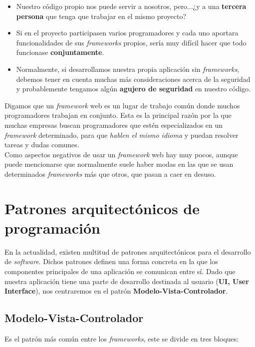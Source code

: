     \begin{itemize}
        \item Nuestro código propio nos puede servir a nosotros, pero...¿y a una
        \textbf{tercera persona} que tenga que trabajar en el mismo proyecto?
        \item Si en el proyecto participasen varios programadores y cada uno aportara
        funcionalidades de sus \textit{frameworks} propios, sería muy difícil hacer que todo
        funcionase \textbf{conjuntamente}.
        \item Normalmente, si desarrollamos nuestra propia aplicación sin \textit{frameworks},
        debemos tener en cuenta muchas más consideraciones acerca de la seguridad y
        probablemente tengamos algún \textbf{agujero de seguridad} en nuestro código.
    \end{itemize}

Digamos que un \textit{framework} web es un lugar de trabajo común donde muchos programadores
trabajan en conjunto. Esta es la principal razón por la que muchas empresas buscan
programadores que estén especializados en un \textit{framework} determinado, para que
\textit{hablen el mismo idioma} y puedan resolver tareas y dudas comunes.\\

Como aspectos negativos de usar un \textit{framework} web hay muy pocos, aunque puede
mencionarse que normalmente suele haber modas en las que se usan determinados
\textit{frameworks} más que otros, que pasan a caer en desuso.\\


\section{Patrones arquitectónicos de programación} \label{sec:architectural-patterns}
En la actualidad, existen multitud de patrones arquitectónicos para el desarrollo de
\textit{software}. Dichos patrones definen una forma concreta en la que los componentes
principales de una aplicación se comunican entre sí. Dado que nuestra aplicación tiene una
parte de desarrollo destinada al usuario (\textbf{UI, User Interface}), nos centraremos en
el patrón \textbf{Modelo-Vista-Controlador}.

\subsection{Modelo-Vista-Controlador} \label{sec:mvc}
Es el patrón más común entre los \textit{frameworks}, este se divide en tres bloques:

